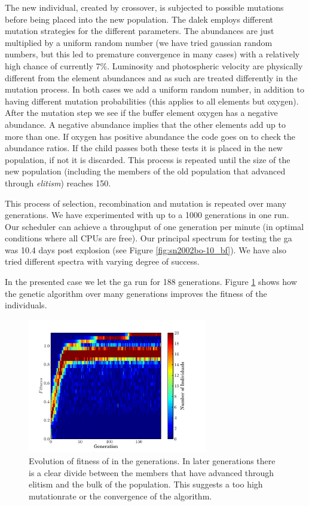 The new individual, created by crossover, is subjected to possible mutations before being placed into the new population. The \gls{dalek} employs different mutation strategies for the different parameters. The abundances are just multiplied by a uniform random number (we have tried gaussian random numbers, but this led to premature convergence in many cases) with a relatively high chance of currently 7\%. Luminosity and photospheric velocity are physically different from the element abundances and as such are treated differently in the mutation process. In both cases we add a uniform random number, in addition to having different mutation probabilities (this applies to all elements but oxygen). After the mutation step we see if the buffer element oxygen has a negative abundance. A negative abundance implies that the other elements add up to more than one. If oxygen has positive abundance the code goes on to check the abundance ratios. If the child passes both these tests it is placed in the new population, if not it is discarded. This process is repeated until the size of the new population (including the members of the old population that advanced through \textit{elitism}) reaches 150.

This process of selection, recombination and mutation is repeated over many generations. We have experimented with up to a 1000 generations in one run. Our scheduler can achieve a throughput of one generation per minute (in optimal conditions where all CPUs are free). 
Our principal spectrum for testing the \gls{ga} was  10.4 days post explosion (see Figure \ref{fig:sn2002bo-10_bf}). We have also tried different spectra with varying degree of success.

In the presented case we let the \gls{ga} run for 188 generations. Figure \ref{fig:fitness_evolution} shows how the genetic algorithm over many generations improves the fitness of the \glspl{individual}. 

\begin{figure}[htbp] %
   \centering
   \includegraphics[width=0.7\textwidth]{chapter_dalek/plots/plot_02bo_fit_evol.pdf} 
     \caption{Evolution of fitness of in the generations. In later generations there is a clear divide between the members that have advanced through elitism and the bulk of the population. This suggests a too high mutationrate or the convergence of the algorithm. }
   \label{fig:fitness_evolution}
\end{figure}

